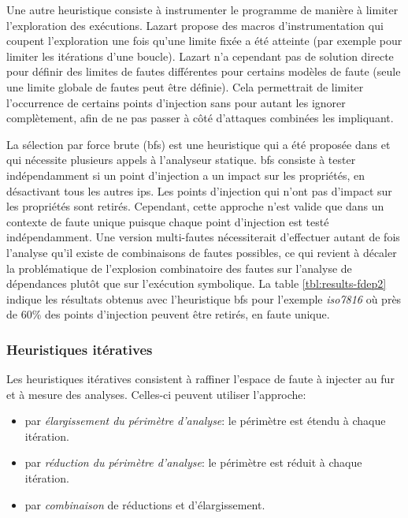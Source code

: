                 Une autre heuristique consiste à instrumenter le programme de manière à limiter l'exploration des exécutions.
                Lazart propose des macros d'instrumentation qui coupent l'exploration une fois qu'une limite fixée a été atteinte (par exemple pour limiter les itérations d'une boucle). 
                Lazart n'a cependant pas de solution directe pour définir des limites de fautes différentes pour certains modèles de faute (seule une limite globale de fautes peut être définie). Cela permettrait de limiter l'occurrence de certains points d'injection sans pour autant les ignorer complètement, afin de ne pas passer à côté d'attaques combinées les impliquant. 

                La sélection par force brute (\gls{bfs}) est une heuristique qui a été proposée dans \cite{lacombe2021combining} et qui nécessite plusieurs appels à l'analyseur statique.
                \gls{bfs} consiste à tester indépendamment si un point d'injection a un impact sur les propriétés, en désactivant tous les autres \gls{ip}s. Les points d'injection qui n'ont pas d'impact sur les propriétés sont retirés.
                Cependant, cette approche n'est valide que dans un contexte de faute unique puisque chaque point d'injection est testé indépendamment. Une version multi-fautes nécessiterait d'effectuer autant de fois l'analyse qu'il existe de combinaisons de fautes possibles, ce qui revient à décaler la problématique de l'explosion combinatoire des fautes sur l'analyse de dépendances plutôt que sur l'exécution symbolique.
                La table \ref{tbl:results-fdep2} indique les résultats obtenus avec l'heuristique \gls{bfs} pour l'exemple \textit{iso7816} où près de 60\% des points d'injection peuvent être retirés, en faute unique.
                
            \subsubsection{Heuristiques itératives}
            \label{sec:lazart:metho:iter}
            
                Les heuristiques itératives consistent à raffiner l'espace de faute à injecter au fur et à mesure des analyses. Celles-ci peuvent utiliser l'approche:
                \begin{itemize}
                    \item par \textit{élargissement du périmètre d'analyse}: le périmètre est étendu à chaque itération.
                    \item par \textit{réduction du périmètre d'analyse}: le périmètre est réduit à chaque itération.
                    \item par \textit{combinaison} de réductions et d'élargissement.
                \end{itemize}
                

